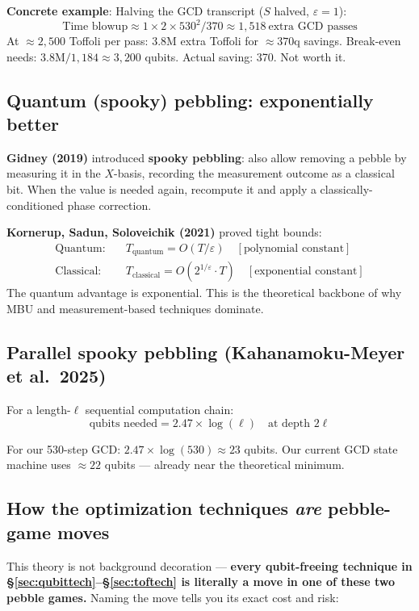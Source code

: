 \documentclass[11pt,a4paper]{article}
\begin{document}
\textbf{Concrete example}: Halving the GCD transcript ($S$ halved, $\varepsilon = 1$):
\[
  \text{Time blowup} \approx 1 \times 2 \times 530^2 / 370 \approx 1{,}518\ \text{extra GCD passes}
\]
At $\approx2{,}500$ Toffoli per pass: 3.8M extra Toffoli for $\approx370$q savings.
Break-even needs: $3.8\text{M} / 1{,}184 \approx 3{,}200$ qubits. Actual saving: 370. Not worth it.

\subsection{Quantum (spooky) pebbling: exponentially better}

\textbf{Gidney (2019)} introduced \textbf{spooky pebbling}: also allow removing a pebble by
measuring it in the $X$-basis, recording the measurement outcome as a classical bit. When the
value is needed again, recompute it and apply a classically-conditioned phase correction.

\textbf{Kornerup, Sadun, Soloveichik (2021)} proved tight bounds:
\begin{align*}
  \text{Quantum:}   &\quad T_{\text{quantum}} = O(T/\varepsilon)           \quad [\text{polynomial constant}] \\
  \text{Classical:} &\quad T_{\text{classical}} = O(2^{1/\varepsilon} \cdot T) \quad [\text{exponential constant}]
\end{align*}
The quantum advantage is exponential. This is the theoretical backbone of why MBU and
measurement-based techniques dominate.

\subsection{Parallel spooky pebbling (Kahanamoku-Meyer et al.\ 2025)}

For a length-$\ell$ sequential computation chain:
\[
  \text{qubits needed} = 2.47 \times \log(\ell) \quad \text{at depth } 2\ell
\]

For our 530-step GCD: $2.47 \times \log(530) \approx 23$ qubits. Our current GCD state machine
uses $\approx22$ qubits --- already near the theoretical minimum.

\subsection{How the optimization techniques \emph{are} pebble-game moves}

This theory is not background decoration --- \textbf{every qubit-freeing technique in
\S\ref{sec:qubittech}--\S\ref{sec:toftech} is literally a move in one of these two pebble games.}
Naming the move tells you its exact cost and risk:
\end{document}

